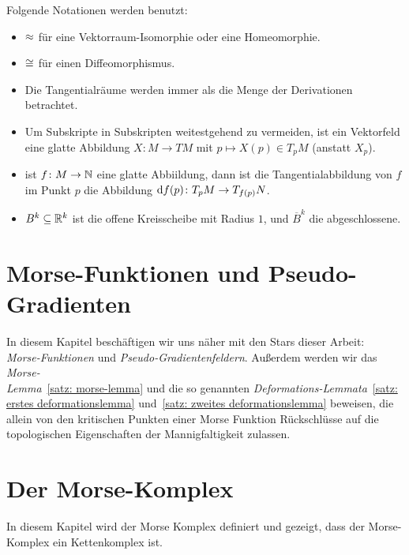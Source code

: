 \documentclass[a4paper,11pt,twoside]{scrreport}
\begin{document}
Folgende Notationen werden benutzt:

\begin{itemize}
    \item $\approx$ für eine Vektorraum-Isomorphie oder eine Homeomorphie.
    \item $\cong$ für einen Diffeomorphismus.
    \item Die Tangentialräume werden immer als die Menge der Derivationen betrachtet.
    \item Um Subskripte in Subskripten weitestgehend zu vermeiden, ist ein Vektorfeld eine 
        glatte Abbildung $X \colon M \to TM$ mit $p \mapsto X(p) \in T_pM$ (anstatt $X_p$).
    \item ist $f \colon M \to { \mathbb N }$ eine glatte Abbiildung, dann ist die Tangentialabbildung
        von $f$ im Punkt $p$ die Abbildung ${ \operatorname{d} } f (p) \colon T_pM \to T_{f(p)}N$.
    \item $B^k \subseteq { \mathbb R }^k$ ist die offene Kreisscheibe mit Radius $1$, und $\overline{B}^k$
        die abgeschlossene.
\end{itemize}

\tableofcontents

\chapter{Morse-Funktionen und Pseudo-Gradienten}

\makeheaderfancy
\setcounter{page}{1}

In diesem Kapitel beschäftigen wir uns näher mit den Stars dieser Arbeit: \\
\textit{Morse-Funktionen} und \textit{Pseudo-Gradientenfeldern}. Außerdem werden wir das 
\textit{Morse-\\Lemma}~\ref{satz: morse-lemma} und die so genannten 
\textit{Deformations-Lemmata}~\ref{satz: erstes deformationslemma} und~\ref{satz: zweites deformationslemma} 
beweisen, die allein von den kritischen Punkten einer Morse Funktion 
Rückschlüsse auf die topologischen Eigenschaften der Mannigfaltigkeit zulassen.






\chapter{Der Morse-Komplex}
In diesem Kapitel wird der Morse Komplex definiert und gezeigt, dass der 
Morse-Komplex ein Kettenkomplex ist.
\end{document}

